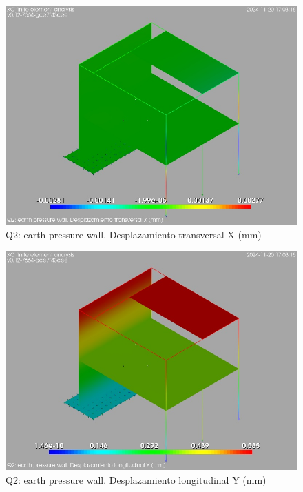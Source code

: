 \begin{figure}[ht]
\begin{center}
\includegraphics[width=\linewidth]{results/graphics/resSimplLC/QearthPressWalluX.png}
\caption{Q2: earth pressure wall. Desplazamiento transversal X (mm)}
\label{QearthPressWalluX}
\end{center}
\end{figure}
\begin{figure}[ht]
\begin{center}
\includegraphics[width=\linewidth]{results/graphics/resSimplLC/QearthPressWalluY.png}
\caption{Q2: earth pressure wall. Desplazamiento longitudinal Y (mm)}
\label{QearthPressWalluY}
\end{center}
\end{figure}
